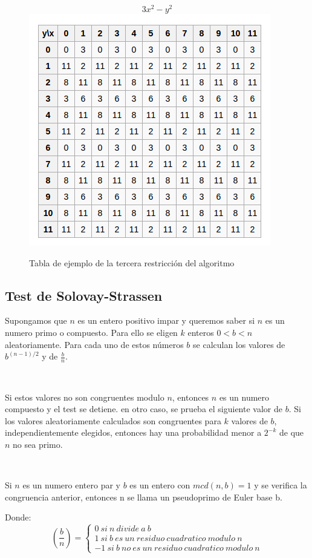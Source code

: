 \documentclass[11pt, conference]{IEEEtran}
\begin{document}
\begin{figure}[h]
	\begin{center}
		\[3x^{2}-y^{2}\]
		\includegraphics[scale=0.5]{4.png}
		\caption{Tabla de ejemplo de la tercera restricción del algoritmo} 
	\end{center}
\end{figure}
\subsection{Test de Solovay-Strassen}
Supongamos que $n$ es un entero positivo impar y queremos saber si $n$ es un numero primo o compuesto. Para ello se eligen $k$ enteros $0<b<n$ aleatoriamente. Para cada uno de estos números $b$ se calculan los valores de $b^{(n-1)/2}$ y de $\frac{b}{n}$.\cite{d}

\

Si estos valores no son congruentes modulo $n$, entonces $n$ es un numero compuesto y el test se detiene. en otro caso, se prueba el siguiente valor de $b$. Si los valores aleatoriamente calculados son congruentes para $k$ valores de $b$, independientemente elegidos, entonces hay una probabilidad menor a $2^{-k}$ de que $n$ no sea primo.

\

Si $n$ es un numero entero par y $b$ es un entero con $mcd(n,b) = 1 $ y se verifica la congruencia anterior, entonces n se llama un pseudoprimo de Euler base b.

Donde:
\begin{equation}
\left( \frac{b}{n} \right) = \left\{ \begin{array}{l}
0\ si\ n\ divide\ a\ b\\		
1\ si\ b\ es\ un\ residuo\ cuadratico\ 
modulo\ n \\
-1\ si\ b\ no\ es\ un\ residuo\ cuadratico\ modulo\ n 
\end{array}
\right.	
\end{equation}
\end{document}
